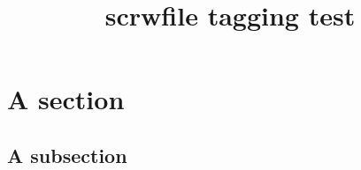 \documentclass{article}
\title{scrwfile tagging test}
\begin{document}
\tableofcontents
\section{A section}
\subsection{A subsection}
\listofstoc
\end{document}
